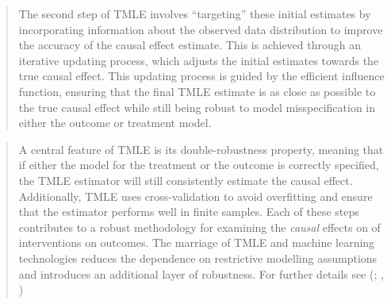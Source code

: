 \documentclass[
  singlecolumn]{article}
\begin{document}
\begin{quote}
The second step of TMLE involves ``targeting'' these initial estimates
by incorporating information about the observed data distribution to
improve the accuracy of the causal effect estimate. This is achieved
through an iterative updating process, which adjusts the initial
estimates towards the true causal effect. This updating process is
guided by the efficient influence function, ensuring that the final TMLE
estimate is as close as possible to the true causal effect while still
being robust to model misspecification in either the outcome or
treatment model.
\end{quote}

\begin{quote}
A central feature of TMLE is its double-robustness property, meaning
that if either the model for the treatment or the outcome is correctly
specified, the TMLE estimator will still consistently estimate the
causal effect. Additionally, TMLE uses cross-validation to avoid
overfitting and ensure that the estimator performs well in finite
samples. Each of these steps contributes to a robust methodology for
examining the \emph{causal} effects on of interventions on outcomes. The
marriage of TMLE and machine learning technologies reduces the
dependence on restrictive modelling assumptions and introduces an
additional layer of robustness. For further details see
(;
,
)
\end{quote}
\end{document}
